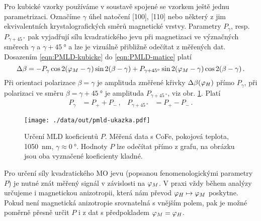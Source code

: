 Pro kubické vzorky používáme v soustavě spojené se vzorkem ještě jednu parametrizaci.
Označíme $\gamma$ úhel natočení [100], [110] nebo některý z jim ekvivalentních krystalografických směrů magnetické vrstvy.
Parametry $P_\gamma$, resp. $P_{\gamma+\SI{45}{\degree}}$ pak vyjadřují sílu kvadratického jevu při magnetizaci ve význačných směrech $\gamma$ a $\gamma+\SI{45}{\degree}$ a lze je vizuálně přibližně odečítat z měřených dat.
Dosazením \eqref{eqn:PMLD-kubicke} do \eqref{eqn:PMLD-matice} platí
\begin{equation}
    \Delta\beta = -P_\gamma \cos 2 (\varphi_M-\gamma) \sin 2(\beta-\gamma) + P_{\gamma+\SI{45}{\degree}} \sin 2 (\varphi_M-\gamma) \cos 2(\beta-\gamma) \,.
\end{equation}
Při orientaci polarizace $\beta=\gamma$ je amplituda změřené křivky $\Delta\beta(\varphi_H)$ přímo $P_{\gamma}$, při polarizaci ve směru $\beta=\gamma+\SI{45}{\degree}$ je amplituda $P_{\gamma+\SI{45}{\degree}}$, viz obr. \ref{fig:urceni-MLD-ilustrace}.
Platí
\begin{align}
    \label{eqn:Pgamma}
    P_{\gamma} &=  P_+ + P_- \,, & P_{\gamma+\SI{45}{\degree}} &= P_+ - P_- \,.
\end{align}

\begin{figure}[htbp]
    \centering
    \texttt{[image: ./data/out/pmld-ukazka.pdf]}
    \caption{Určení MLD koeficientů $P$. Měřená data s CoFe, pokojová teplota, \SI{1050}{\nano\meter}, $\gamma\approx\SI{0}{\degree}$. Hodnoty $P$ lze odečítat přímo z grafu, na obrázku jsou oba vyznačené koeficienty kladné.}
    \label{fig:urceni-MLD-ilustrace}
\end{figure}

Pro určení síly kvadratického MO jevu (popsanou fenomenologickými parametry $P$) je nutné znát měřený signál v závislosti na $\varphi_M$.
V praxi vždy během analýzy určujeme i magnetickou anizotropii, která nám převod $\varphi_H \mapsto \varphi_M$ poskytne.
Pokud není magnetická anizotropie srovnatelná s vnějším polem, pak je možné poměrně přesně určit $P$ i z dat s předpokladem $\varphi_M=\varphi_H$.

